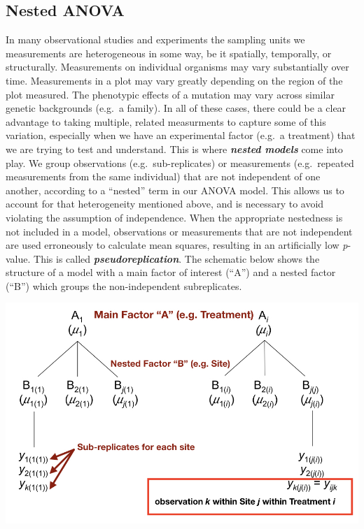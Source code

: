 \documentclass[]{book}
\begin{document}
\hypertarget{nested-anova}{%
\subsection{Nested ANOVA}\label{nested-anova}}

In many observational studies and experiments the sampling units we measurements are heterogeneous in some way, be it spatially, temporally, or structurally. Measurements on individual organisms may vary substantially over time. Measurements in a plot may vary greatly depending on the region of the plot measured. The phenotypic effects of a mutation may vary across similar genetic backgrounds (e.g.~a family). In all of these cases, there could be a clear advantage to taking multiple, related measurments to capture some of this variation, especially when we have an experimental factor (e.g.~a treatment) that we are trying to test and understand. This is where \textbf{\emph{nested models}} come into play. We group observations (e.g.~sub-replicates) or measurements (e.g.~repeated measurements from the same individual) that are not independent of one another, according to a ``nested'' term in our ANOVA model. This allows us to account for that heterogeneity mentioned above, and is necessary to avoid violating the assumption of independence. When the appropriate nestedness is not included in a model, observations or measurements that are not independent are used erroneously to calculate mean squares, resulting in an artificially low \emph{p}-value. This is called \textbf{\emph{pseudoreplication}}. The schematic below shows the structure of a model with a main factor of interest (``A'') and a nested factor (``B'') which groups the non-independent subreplicates.

\begin{center}\includegraphics[width=0.9\linewidth]{images/images_7a.005} \end{center}
\end{document}
